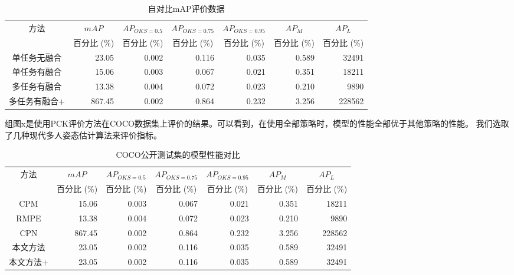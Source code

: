\begin{longtable}[c]{c*{6}{r}}
	\caption{自对比mAP评价数据}
	\label{tab:mAPCOCOselfbenchmark}\\
	\toprule[1.5pt]
	方法 & \multicolumn{1}{c}{$mAP$} & \multicolumn{1}{c}{$AP_{OKS=0.5}$} & \multicolumn{1}{c}{$AP_{OKS=0.75}$} & \multicolumn{1}{c}{$AP_{OKS=0.95}$}
	& \multicolumn{1}{c}{$AP_M$} & \multicolumn{1}{c}{$AP_L$} \\
	
	& \multicolumn{1}{c}{百分比 (\%)}& \multicolumn{1}{c}{百分比 (\%)}&
	\multicolumn{1}{c}{百分比 (\%)}& \multicolumn{1}{c}{百分比 (\%)}& \multicolumn{1}{c}{
		百分比 (\%)}&  \multicolumn{1}{c}{
		百分比 (\%)}\\\midrule[1pt]
	\endhead
	\endlastfoot
	单任务无融合 & 23.05 & 0.002 & 0.116 & 0.035 & 0.589 & 32491 \\
	单任务有融合 & 15.06 & 0.003 & 0.067 & 0.021 & 0.351 & 18211 \\
	多任务有融合 & 13.38 & 0.004 & 0.072 & 0.023 & 0.210 & 9890 \\
	多任务有融合+ & 867.45 & 0.002 & 0.864 & 0.232 & 3.256 & 228562 \\
	\bottomrule[1.5pt]
\end{longtable}

组图x是使用PCK评价方法在COCO数据集上评价的结果。可以看到，在使用全部策略时，模型的性能全部优于其他策略的性能。
我们选取了几种现代多人姿态估计算法来评价指标。
\begin{longtable}[c]{c*{6}{r}}
	\caption{COCO公开测试集的模型性能对比}
	\label{tab:mAPCOCObenchmark}\\
	\toprule[1.5pt]
	方法 & \multicolumn{1}{c}{$mAP$} & \multicolumn{1}{c}{$AP_{OKS=0.5}$} & \multicolumn{1}{c}{$AP_{OKS=0.75}$} & \multicolumn{1}{c}{$AP_{OKS=0.95}$}
	& \multicolumn{1}{c}{$AP_M$} & \multicolumn{1}{c}{$AP_L$} \\
	
	& \multicolumn{1}{c}{百分比 (\%)}& \multicolumn{1}{c}{百分比 (\%)}&
	\multicolumn{1}{c}{百分比 (\%)}& \multicolumn{1}{c}{百分比 (\%)}& \multicolumn{1}{c}{
		百分比 (\%)}&  \multicolumn{1}{c}{
		百分比 (\%)}\\\midrule[1pt]
	\endhead
	\endlastfoot
	CPM\cite{wei2016convolutional} & 15.06 & 0.003 & 0.067 & 0.021 & 0.351 & 18211 \\
	RMPE\cite{fang2017rmpe} & 13.38 & 0.004 & 0.072 & 0.023 & 0.210 & 9890 \\
	CPN\cite{Chen2017Cascaded} & 867.45 & 0.002 & 0.864 & 0.232 & 3.256 & 228562 \\
	本文方法 & 23.05 & 0.002 & 0.116 & 0.035 & 0.589 & 32491 \\
	本文方法+ & 23.05 & 0.002 & 0.116 & 0.035 & 0.589 & 32491 \\
	\bottomrule[1.5pt]
\end{longtable}

